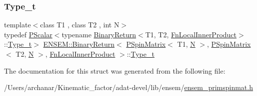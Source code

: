 \subsubsection{\texorpdfstring{Type\_t}{Type\_t}\hspace{0.1cm}{\footnotesize\ttfamily [3/3]}}
{\footnotesize\ttfamily template$<$class T1 , class T2 , int N$>$ \\
typedef \mbox{\hyperlink{classENSEM_1_1PScalar}{P\+Scalar}}$<$typename \mbox{\hyperlink{structENSEM_1_1BinaryReturn}{Binary\+Return}}$<$T1, T2, \mbox{\hyperlink{structENSEM_1_1FnLocalInnerProduct}{Fn\+Local\+Inner\+Product}}$>$\+::\mbox{\hyperlink{structENSEM_1_1BinaryReturn_3_01PSpinMatrix_3_01T1_00_01N_01_4_00_01PSpinMatrix_3_01T2_00_01N_01c4db3884b32cba02d837337f3b77f0f0_ac43278b464e4f4a3921f9267c7e2e71d}{Type\+\_\+t}}$>$ \mbox{\hyperlink{structENSEM_1_1BinaryReturn}{E\+N\+S\+E\+M\+::\+Binary\+Return}}$<$ \mbox{\hyperlink{classENSEM_1_1PSpinMatrix}{P\+Spin\+Matrix}}$<$ T1, \mbox{\hyperlink{adat__devel_2lib_2hadron_2operator__name__util_8cc_a7722c8ecbb62d99aee7ce68b1752f337}{N}} $>$, \mbox{\hyperlink{classENSEM_1_1PSpinMatrix}{P\+Spin\+Matrix}}$<$ T2, \mbox{\hyperlink{adat__devel_2lib_2hadron_2operator__name__util_8cc_a7722c8ecbb62d99aee7ce68b1752f337}{N}} $>$, \mbox{\hyperlink{structENSEM_1_1FnLocalInnerProduct}{Fn\+Local\+Inner\+Product}} $>$\+::\mbox{\hyperlink{structENSEM_1_1BinaryReturn_3_01PSpinMatrix_3_01T1_00_01N_01_4_00_01PSpinMatrix_3_01T2_00_01N_01c4db3884b32cba02d837337f3b77f0f0_ac43278b464e4f4a3921f9267c7e2e71d}{Type\+\_\+t}}}



The documentation for this struct was generated from the following file\+:\begin{DoxyCompactItemize}
\item 
/\+Users/archanar/\+Kinematic\+\_\+factor/adat-\/devel/lib/ensem/\mbox{\hyperlink{adat-devel_2lib_2ensem_2ensem__primspinmat_8h}{ensem\+\_\+primspinmat.\+h}}\end{DoxyCompactItemize}
